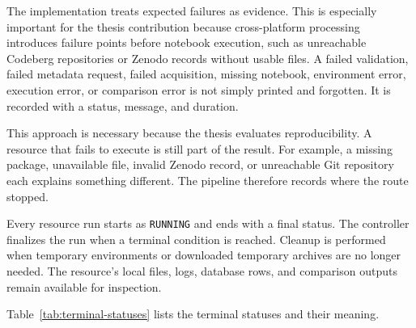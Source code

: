 The implementation treats expected failures as evidence. This is especially important for the thesis contribution because cross-platform processing introduces failure points before notebook execution, such as unreachable Codeberg repositories or Zenodo records without usable files. A failed validation, failed metadata request, failed acquisition, missing notebook, environment error, execution error, or comparison error is not simply printed and forgotten. It is recorded with a status, message, and duration.

This approach is necessary because the thesis evaluates reproducibility. A resource that fails to execute is still part of the result. For example, a missing package, unavailable file, invalid Zenodo record, or unreachable Git repository each explains something different. The pipeline therefore records where the route stopped.

Every resource run starts as \texttt{RUNNING} and ends with a final status. The controller finalizes the run when a terminal condition is reached. Cleanup is performed when temporary environments or downloaded temporary archives are no longer needed. The resource's local files, logs, database rows, and comparison outputs remain available for inspection.

Table~\ref{tab:terminal-statuses} lists the terminal statuses and their meaning.

